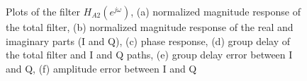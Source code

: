 \documentclass[a4paper,BCOR7mm,12pt,pointlessnumbers,bibtotoc]{scrartcl}
\begin{document}
\begin{figure}[H]
  \caption{Plots of the filter $H_{A2}(e^{j \omega})$, (a) normalized magnitude response of the total filter, (b) normalized magnitude response of the real and imaginary parts (I and Q), (c) phase response, (d) group delay of the total filter and I and Q paths, (e) group delay error between I and Q, (f) amplitude error between I and Q}
  \label{fig:h_a2}
\end{figure}
\end{document}
